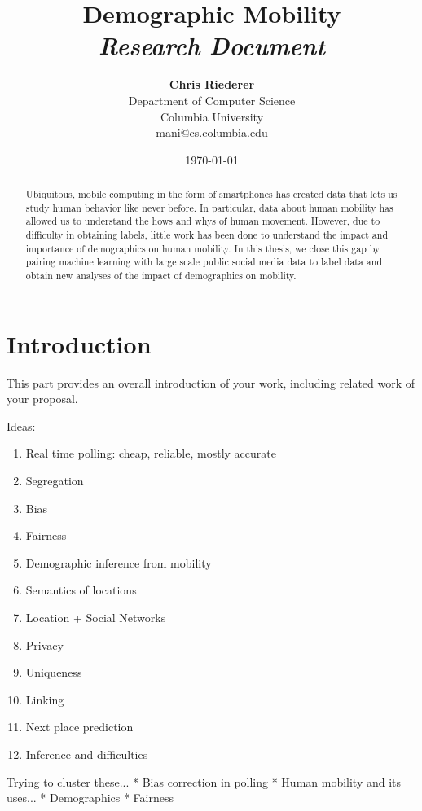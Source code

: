 \documentclass[12pt]{article}
\title{{\bf Demographic Mobility} \\
\it Research Document}
\author{ {\bf Chris Riederer}  \\
Department of Computer Science \\
Columbia University\\
{\small mani@cs.columbia.edu}
}
\date{\today}
\begin{document}
\pagestyle{plain}
\maketitle

\pagebreak
\begin{abstract}

Ubiquitous, mobile computing in the form of smartphones has created data that lets us study human behavior like never before.
In particular, data about human mobility has allowed us to understand the hows and whys of human movement.
However, due to difficulty in obtaining labels, little work has been done to understand the impact and importance of demographics on human mobility.
In this thesis, we close this gap by pairing machine learning with large scale public social media data to label data and obtain new analyses of the impact of demographics on mobility.


\end{abstract}

\pagebreak
\tableofcontents
\pagebreak

\cleardoublepage
{}

\section{Introduction}
\label{ch:intro}

This part provides an overall introduction of your work, including
related work of your proposal.

Ideas:
\begin{enumerate}
\item Real time polling: cheap, reliable, mostly accurate
\item Segregation
\item Bias
\item Fairness
\item Demographic inference from mobility
\item Semantics of locations
\item Location + Social Networks
\item Privacy
\item Uniqueness
\item Linking
\item Next place prediction
\item Inference and difficulties 
\end{enumerate}

Trying to cluster these...
* Bias correction in polling
* Human mobility and its uses...
* Demographics
* Fairness
\end{document}
